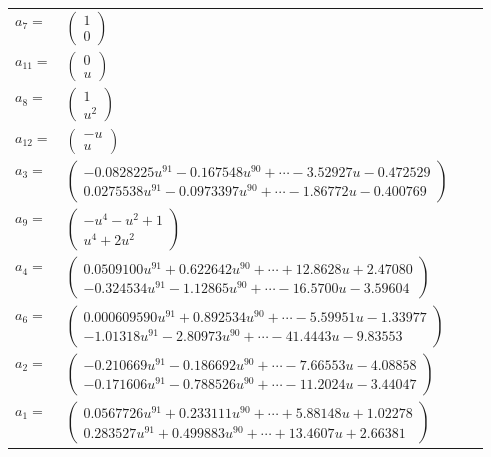 \documentclass[1p]{elsarticle_modified}
\theoremstyle{definition}
\begin{document}
\begin{tabular}{m{7pt} m{180pt} m{7pt} m{180pt} }
\flushright $a_{7}=$&$\begin{pmatrix}1\\0\end{pmatrix}$ \\
\flushright $a_{11}=$&$\begin{pmatrix}0\\u\end{pmatrix}$ \\
\flushright $a_{8}=$&$\begin{pmatrix}1\\u^2\end{pmatrix}$ \\
\flushright $a_{12}=$&$\begin{pmatrix}- u\\u\end{pmatrix}$ \\
\flushright $a_{3}=$&$\begin{pmatrix}-0.0828225 u^{91}-0.167548 u^{90}+\cdots-3.52927 u-0.472529\\0.0275538 u^{91}-0.0973397 u^{90}+\cdots-1.86772 u-0.400769\end{pmatrix}$ \\
\flushright $a_{9}=$&$\begin{pmatrix}- u^4- u^2+1\\u^4+2 u^2\end{pmatrix}$ \\
\flushright $a_{4}=$&$\begin{pmatrix}0.0509100 u^{91}+0.622642 u^{90}+\cdots+12.8628 u+2.47080\\-0.324534 u^{91}-1.12865 u^{90}+\cdots-16.5700 u-3.59604\end{pmatrix}$ \\
\flushright $a_{6}=$&$\begin{pmatrix}0.000609590 u^{91}+0.892534 u^{90}+\cdots-5.59951 u-1.33977\\-1.01318 u^{91}-2.80973 u^{90}+\cdots-41.4443 u-9.83553\end{pmatrix}$ \\
\flushright $a_{2}=$&$\begin{pmatrix}-0.210669 u^{91}-0.186692 u^{90}+\cdots-7.66553 u-4.08858\\-0.171606 u^{91}-0.788526 u^{90}+\cdots-11.2024 u-3.44047\end{pmatrix}$ \\
\flushright $a_{1}=$&$\begin{pmatrix}0.0567726 u^{91}+0.233111 u^{90}+\cdots+5.88148 u+1.02278\\0.283527 u^{91}+0.499883 u^{90}+\cdots+13.4607 u+2.66381\end{pmatrix}$ \\

\end{tabular}
\end{document}
